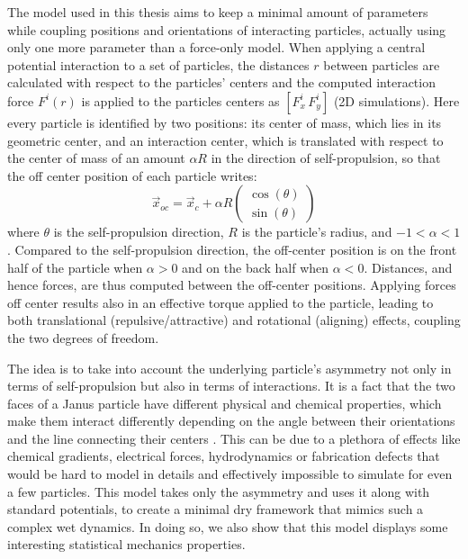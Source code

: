 \documentclass[../../master_thesis_np.tex]{subfiles}
\begin{document}
	The model used in this thesis aims to keep a minimal amount of parameters while coupling positions and orientations of interacting particles, actually using only one more parameter than a force-only model.
	{\color{brown}When applying a central potential interaction to a set of particles, the distances $r$ between particles are calculated with respect to the particles' centers and the computed interaction force $F^i(r)$ is applied to the particles centers as $\left[F^i_x\, F^i_y\right]$ (2D simulations).}
	Here every particle is identified by two positions: its center of mass, which lies in its geometric center, and an interaction center, which is translated with respect to the center of mass of an amount $\alpha R$ in the direction of self-propulsion, so that the off center position of each particle writes:
	\begin{equation}
		\vec{x}_{oc} = \vec{x}_{c} + \alpha R 
		\begin{pmatrix}
			\cos(\theta)\\
			\sin(\theta)
		\end{pmatrix}
	\end{equation}
	where $\theta$ is the self-propulsion direction, $R$ is the particle's radius, and $-1 < \alpha < 1$. 
	{\color{green}Compared to the self-propulsion direction, the off-center position is on the front half of the particle when $\alpha > 0$ and on the back half when $\alpha < 0$.}
	{\color{brown}Distances, and hence forces, are thus computed between the off-center positions. 
	Applying forces off center results also in an effective torque applied to the particle, leading to both translational (repulsive/attractive) and rotational (aligning) effects, coupling the two degrees of freedom.}
	
	The idea is to take into account the underlying particle's asymmetry not only in terms of self-propulsion but also in terms of interactions. 
	It is a fact that the two faces of a Janus particle have different physical and chemical properties, which make them interact differently depending on the angle between their orientations and the line connecting their centers \cite{singh_pair_2024}. 
	{\color{brown}This can be due to a plethora of effects like chemical gradients, electrical forces, hydrodynamics or fabrication defects that would be hard to model in details and effectively impossible to simulate for even a few particles.
	This model takes only the asymmetry and uses it along with standard potentials, to create a minimal dry framework that mimics such a complex wet dynamics.} 
	In doing so, we also show that this model displays some interesting statistical mechanics properties.
	
\end{document}
